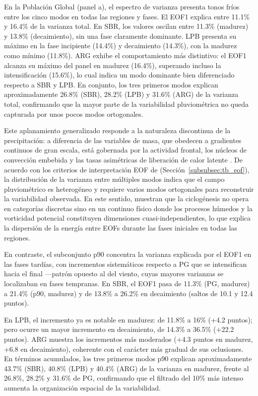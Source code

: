 En la Población Global (panel a), el espectro de varianza presenta tonos fríos entre los cinco modos en todas las regiones y fases. El EOF1 explica entre 11.1\% y 16.4\% de la varianza total. En SBR, los valores oscilan entre 11.3\% (madurez) y 13.8\% (decaimiento), sin una fase claramente dominante. LPB presenta su máximo en la fase incipiente (14.4\%) y decaimiento (14.3\%), con la madurez como mínimo (11.8\%). ARG exhibe el comportamiento más distintivo: el EOF1 alcanza su máximo del panel en madurez (16.4\%), superando incluso la intensificación (15.6\%), lo cual indica un modo dominante bien diferenciado respecto a SBR y LPB. En conjunto, los tres primeros modos explican aproximadamente 26.8\% (SBR), 28.2\% (LPB) y 31.6\% (ARG) de la varianza total, confirmando que la mayor parte de la variabilidad pluviométrica no queda capturada por unos pocos modos ortogonales.

Este aplanamiento generalizado responde a la naturaleza discontinua de la precipitación: a diferencia de las variables de masa, que obedecen a gradientes continuos de gran escala, está gobernada por la actividad frontal, los núcleos de convección embebida y las tasas asimétricas de liberación de calor latente \citep{oertel2021warm}. De acuerdo con los criterios de interpretación EOF de \citet{hannachi2007empirical} (Sección~\ref{subsubsec:tb_eof}), la distribución de la varianza entre múltiples modos indica que el campo pluviométrico es heterogéneo y requiere varios modos ortogonales para reconstruir la variabilidad observada. En este sentido, \citet{graf2017objective} muestran que la ciclogénesis no opera en categorías discretas sino en un continuo físico donde los procesos húmedos y la vorticidad potencial constituyen dimensiones cuasi-independientes, lo que explica la dispersión de la energía entre EOFs durante las fases iniciales en todas las regiones.

En contraste, el subconjunto p90 concentra la varianza explicada por el EOF1 en las fases tardías, con incrementos sistemáticos respecto a PG que se intensifican hacia el final —patrón opuesto al del viento, cuyas mayores varianzas se localizaban en fases tempranas. En SBR, el EOF1 pasa de 11.3\% (PG, madurez) a 21.4\% (p90, madurez) y de 13.8\% a 26.2\% en decaimiento (saltos de 10.1 y 12.4 puntos). 

En LPB, el incremento ya es notable en madurez: de 11.8\% a 16\% ($+$4.2 puntos); pero ocurre un mayor incremento en decaimiento, de 14.3\% a 36.5\% ($+$22.2 puntos).
ARG muestra los incrementos más moderados ($+$4.3 puntos en madurez, $+$6.8 en decaimiento), coherente con el carácter más gradual de sus oclusiones. 
En términos acumulados, los tres primeros modos p90 explican aproximadamente 43.7\% (SBR), 40.8\% (LPB) y 40.4\% (ARG) de la varianza en madurez, frente al 26.8\%, 28.2\% y 31.6\% de PG, confirmando que el filtrado del 10\% más intenso aumenta la organización espacial de la variabilidad.

